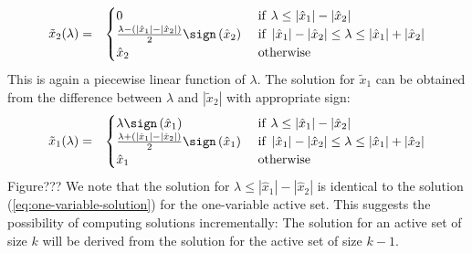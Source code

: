 \begin{eqnarray}
\tilde{x}_{2}(\lambda) & = & \begin{cases}
0 & \mbox{\textrm{ if }}\lambda\le\left|\hat{x}_{1}\right|-\left|\hat{x}_{2}\right|\\
\frac{\lambda-\left(\left|\hat{x}_{1}\right|-\left|\hat{x}_{2}\right|\right)}{2}\sign\left(\hat{x}_{2}\right) & \textrm{ if }\left|\hat{x}_{1}\right|-\left|\hat{x}_{2}\right|\le\lambda\le\left|\hat{x}_{1}\right|+\left|\hat{x}_{2}\right|\\
\hat{x}_{2} & \textrm{ otherwise}
\end{cases}
\end{eqnarray}
This is again a piecewise linear function of $\lambda$. The solution
for $\tilde{x}_{1}$ can be obtained from the difference between $\lambda$
and $\left|\tilde{x}_{2}\right|$ with appropriate sign:
\begin{eqnarray}
\tilde{x}_{1}(\lambda) & = & \begin{cases}
\lambda\sign\left(\hat{x}_{1}\right) & \mbox{\textrm{ if }}\lambda\le\left|\hat{x}_{1}\right|-\left|\hat{x}_{2}\right|\\
\frac{\lambda+\left(\left|\hat{x}_{1}\right|-\left|\hat{x}_{2}\right|\right)}{2}\sign\left(\hat{x}_{1}\right) & \textrm{ if }\left|\hat{x}_{1}\right|-\left|\hat{x}_{2}\right|\le\lambda\le\left|\hat{x}_{1}\right|+\left|\hat{x}_{2}\right|\\
\hat{x}_{1} & \textrm{ otherwise}
\end{cases}
\end{eqnarray}
Figure??? We note that the solution for $\lambda\le\left|\hat{x}_{1}\right|-\left|\hat{x}_{2}\right|$
is identical to the solution (\ref{eq:one-variable-solution}) for
the one-variable active set. This suggests the possibility of computing
solutions incrementally: The solution for an active set of size $k$
will be derived from the solution for the active set of size $k-1$. 


